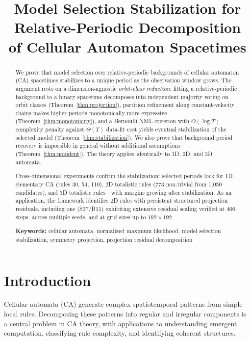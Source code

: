 \documentclass[11pt]{article}
\title{Model Selection Stabilization for Relative-Periodic Decomposition\\of Cellular Automaton Spacetimes}
\author{}
\date{}
\theoremstyle{definition}
\theoremstyle{remark}
\begin{document}
\maketitle

\begin{abstract}
We prove that model selection over relative-periodic backgrounds of cellular automaton (CA) spacetimes stabilizes to a unique period as the observation window grows.
The argument rests on a dimension-agnostic \emph{orbit-class reduction}: fitting a relative-periodic background to a binary spacetime decomposes into independent majority voting on orbit classes (Theorem~\ref{thm:projection}), partition refinement along constant-velocity chains makes higher periods monotonically more expressive (Theorem~\ref{thm:monotonicity}), and a Bernoulli NML criterion with $O(\log T)$ complexity penalty against $\Theta(T)$ data-fit cost yields eventual stabilization of the selected model (Theorem~\ref{thm:stabilization}).
We also prove that background period recovery is impossible in general without additional assumptions (Theorem~\ref{thm:nonident}).
The theory applies identically to 1D, 2D, and 3D automata.

Cross-dimensional experiments confirm the stabilization: selected periods lock for 1D elementary CA (rules 30, 54, 110), 2D totalistic rules (773 non-trivial from 1{,}050 candidates), and 3D totalistic rules---with margins growing after stabilization.
As an application, the framework identifies 2D rules with persistent structured projection residuals, including one (S37/B11) exhibiting extensive residual scaling verified at 400 steps, across multiple seeds, and at grid sizes up to $192 \times 192$.

\medskip\noindent
\textbf{Keywords:} cellular automata, normalized maximum likelihood, model selection stabilization, symmetry projection, projection residual decomposition
\end{abstract}

\section{Introduction}

Cellular automata (CA) generate complex spatiotemporal patterns from simple local rules.
Decomposing these patterns into regular and irregular components is a central problem in CA theory, with applications to understanding emergent computation, classifying rule complexity, and identifying coherent structures.
\end{document}
